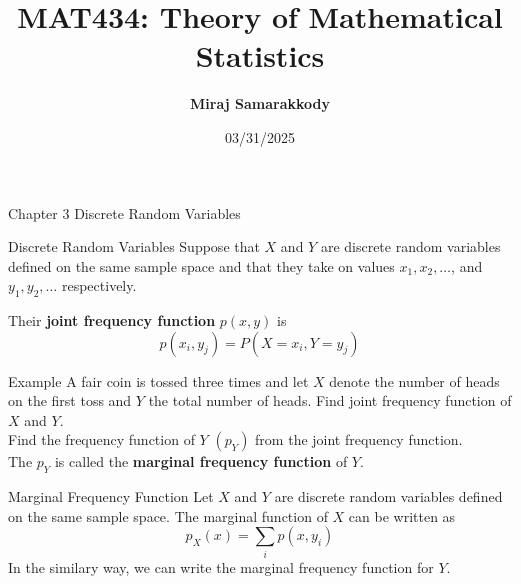 \documentclass{beamer}
\title{MAT434: Theory of Mathematical Statistics}
\author{\textbf{Miraj Samarakkody}}
\institute{Tougaloo College}
\date{03/31/2025}
\begin{document}
\begin{frame}
    \titlepage
\end{frame}








\begin{frame}{Chapter 3}
 \Huge{Discrete Random Variables}
\end{frame}



\begin{frame}{Discrete Random Variables}
    Suppose that \(X\) and \(Y\) are discrete random variables defined on the same sample space and that they take on values \(x_1,x_2, \dots\), and \(y_1,y_2, \dots\) respectively. \\ \pause
    \vspace{0.1in}

    Their \textbf{joint frequency function} \(p(x,y)\) is \[
    p(x_i, y_j) =P(X=x_i, Y=y_j)
    \]
\end{frame}

\begin{frame}{Example}
    A fair coin is tossed three times and let \(X\) denote the number of heads on the first toss and \(Y\) the total number of heads. Find joint frequency function of \(X\) and \(Y\).  \\ \pause
    \vspace{0.2in}
    Find the frequency function of \(Y\) \((p_Y)\) from the joint frequency function. \\ \pause
    \vspace{0.2in}
    The \(p_Y\) is called the \textbf{marginal frequency function} of \(Y\). 
\end{frame}

\begin{frame}{Marginal Frequency Function}
Let \(X\) and \(Y\) are discrete random variables defined on the same sample space. The marginal function of \(X\) can be written as 
\[p_X(x)= \sum_i p(x,y_i)\] In the similary way, we can write the marginal frequency function for \(Y\).
\end{frame}
\end{document}
